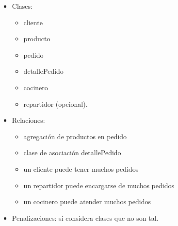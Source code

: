 \documentclass[11pt,letterpaper]{article}
\begin{document}
\begin{spacing}{1.2}
\begin{NewAnswer}
\begin{itemize}
        \begin{itemize}
            \item Clases:
            \begin{itemize}
                \item cliente
                \item producto
                \item pedido
                \item detallePedido
                \item cocinero
                \item repartidor (opcional).
            \end{itemize}
            \item Relaciones:
            \begin{itemize}
                \item agregación de productos en pedido
                \item clase de asociación detallePedido
                \item un cliente puede tener muchos pedidos
                \item un repartidor puede encargarse de muchos pedidos
                \item un cocinero puede atender muchos pedidos
            \end{itemize}
            \item Penalizaciones: si considera clases que no son tal.
        \end{itemize}
    \end{itemize}
\end{NewAnswer}

\end{spacing}
\end{document}

